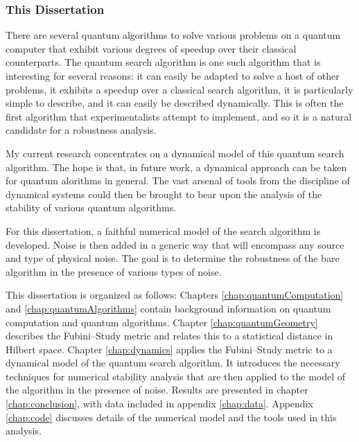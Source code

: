 \subsubsection{This Dissertation} 

There are several quantum algorithms to solve various problems
on a quantum computer that exhibit various degrees of 
speedup over their classical counterparts.  
The quantum search algorithm is one such algorithm that is
interesting for several reasons: it can easily be adapted to
solve a host of other problems, it exhibits a speedup over a
classical search algorithm, it is particularly simple to 
describe, and it can easily be described dynamically.
This is often the first algorithm that experimentalists attempt
to implement, and so it is a natural candidate for a 
robustness analysis.

My current research concentrates on a dynamical model of this
quantum search algorithm.  The hope is that, in future work,
a dynamical approach can be taken for quantum alorithms in 
general.  The vast arsenal of tools from the discipline of 
dynamical systems could then be brought to bear upon the 
analysis of the stability of various quantum algorithms.

For this dissertation, a faithful numerical model of the search
algorithm is developed.  Noise is then added
in a generic way that will encompass any source and type of 
physical noise.
The goal is to determine the robustness of the bare algorithm
in the presence of various types of noise.

This dissertation is organized as follows:  Chapters \ref{chap:quantumComputation}
and \ref{chap:quantumAlgorithms} contain background information on quantum computation
and quantum algorithms.
Chapter \ref{chap:quantumGeometry} describes the
Fubini--Study metric and relates this to a statistical distance in Hilbert space.
Chapter \ref{chap:dynamics} applies the Fubini--Study  metric to a dynamical 
model of the quantum search algorithm.
It introduces the
necessary techniques for numerical stability analysis that are then applied to
the model of the algorithm in the presence of noise. 
Results are presented in chapter \ref{chap:conclusion}, with
data included in appendix \ref{chap:data}.
Appendix \ref{chap:code} discusses details of the numerical model and the 
tools used in this analysis. 


